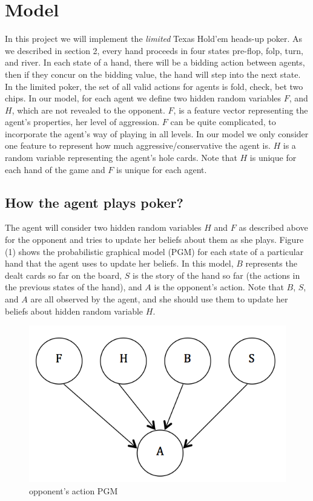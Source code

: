 \section{Model}
In this project we will implement the \emph{limited} Texas Hold'em heads-up poker. As we
described in section 2, every hand proceeds in four states pre-flop, folp, 
turn, and river. In each state of a hand, there will be a bidding action 
between agents, then if they concur on the bidding value, the hand will
step into the next state. In the limited poker, the set of all valid actions 
for agents is fold, check, bet two chips. In our model, for each agent
we define two hidden random variables $F$, and $H$, which are not revealed to the
opponent. $F$, is a feature vector representing the agent's properties, \ie her 
level of aggression. $F$ can be quite complicated, to incorporate the 
agent's way of playing in all levels. In our model we only consider one feature 
to represent how much aggressive/conservative the agent is. $H$ is a random
variable representing the agent's hole cards. Note that $H$ is unique for 
each hand of the game and $F$ is unique for each agent.

\subsection{How the agent plays poker?}
The agent will consider two hidden random variables $H$ and $F$ as described above 
for the opponent and tries to update her beliefs about them as she plays. Figure (1) shows the
probabilistic graphical model (PGM) for each state of a 
particular hand that the agent uses to update her 
beliefs. In this model, $B$ represents the dealt cards so far on the board, $S$ is the 
story of the hand so far (\ie the actions in the previous states of the hand), and 
$A$ is the opponent's action. Note that $B$, $S$, and $A$ are all observed by the
agent, and she should use them to update her beliefs about hidden random variable
$H$.
 
\begin{figure}[h!]
  	\centering
 	\includegraphics[scale = .55]{fig1}
	\caption{opponent's action PGM}
\end{figure}
